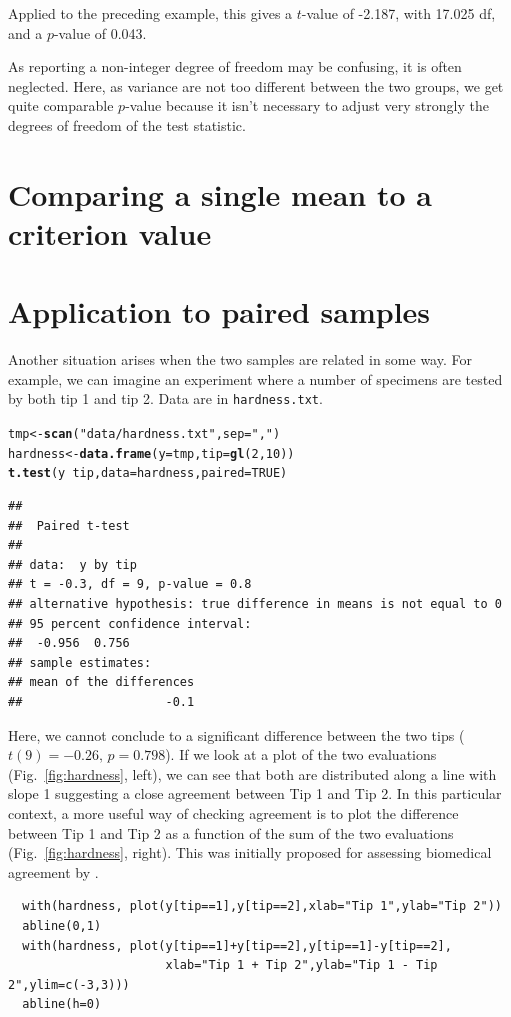 \documentclass[11pt,a4paper]{memoir}\usepackage[]{graphicx}\usepackage[]{color}
\makeatletter
\newcommand{\hlnum}[1]{\textcolor[rgb]{0.686,0.059,0.569}{#1}}%
\newcommand{\hlstr}[1]{\textcolor[rgb]{0.192,0.494,0.8}{#1}}%
\newcommand{\hlopt}[1]{\textcolor[rgb]{0,0,0}{#1}}%
\newcommand{\hlstd}[1]{\textcolor[rgb]{0.345,0.345,0.345}{#1}}%
\newcommand{\hlkwb}[1]{\textcolor[rgb]{0.69,0.353,0.396}{#1}}%
\newcommand{\hlkwc}[1]{\textcolor[rgb]{0.333,0.667,0.333}{#1}}%
\newcommand{\hlkwd}[1]{\textcolor[rgb]{0.737,0.353,0.396}{\textbf{#1}}}%
\newenvironment{kframe}{%
 \def\at@end@of@kframe{}%
 \ifinner\ifhmode%
  \def\at@end@of@kframe{\end{minipage}}%
  \begin{minipage}{\columnwidth}%
 \fi\fi%
 \def\FrameCommand##1{\hskip\@totalleftmargin \hskip-\fboxsep
 \colorbox{shadecolor}{##1}\hskip-\fboxsep
     \hskip-\linewidth \hskip-\@totalleftmargin \hskip\columnwidth}%
 \MakeFramed {\advance\hsize-\width
   \@totalleftmargin\z@ \linewidth\hsize
   \@setminipage}}%
 {\par\unskip\endMakeFramed%
 \at@end@of@kframe}
\newenvironment{knitrout}{}{} %
\makeatother
\begin{document}
Applied to the preceding example, this gives a $t$-value of -2.187,
with 17.025 df, and a $p$-value of 0.043.

As reporting a non-integer degree of freedom may be confusing, it is
often neglected. Here, as variance are not too different between the
two groups, we get quite comparable $p$-value because it isn't
necessary to adjust very strongly the degrees of freedom of the test
statistic.


\section{Comparing a single mean to a criterion value}

\section{Application to paired samples}
Another situation arises when the two samples are related in some
way. For example, we can imagine an experiment where a number of
specimens are tested by both tip 1 and tip 2. Data are in
\texttt{hardness.txt}.

\begin{knitrout}
\color{fgcolor}\begin{kframe}
\begin{alltt}
\hlstd{tmp} \hlkwb{<-} \hlkwd{scan}\hlstd{(}\hlstr{"data/hardness.txt"}\hlstd{,} \hlkwc{sep} \hlstd{=} \hlstr{","}\hlstd{)}
\hlstd{hardness} \hlkwb{<-} \hlkwd{data.frame}\hlstd{(}\hlkwc{y} \hlstd{= tmp,} \hlkwc{tip} \hlstd{=} \hlkwd{gl}\hlstd{(}\hlnum{2}\hlstd{,}\hlnum{10}\hlstd{))}
\hlkwd{t.test}\hlstd{(y} \hlopt{~} \hlstd{tip,} \hlkwc{data} \hlstd{= hardness,} \hlkwc{paired} \hlstd{=} \hlnum{TRUE}\hlstd{)}
\end{alltt}
\begin{verbatim}
## 
## 	Paired t-test
## 
## data:  y by tip
## t = -0.3, df = 9, p-value = 0.8
## alternative hypothesis: true difference in means is not equal to 0
## 95 percent confidence interval:
##  -0.956  0.756
## sample estimates:
## mean of the differences 
##                    -0.1
\end{verbatim}
\end{kframe}
\end{knitrout}

Here, we cannot conclude to a significant difference between the two
tips ($t(9)=-0.26,\, p=0.798$).  If we look at a plot of the two
evaluations (Fig.~\ref{fig:hardness}, left), we can see that both are
distributed along a line with slope 1 suggesting a close agreement
between Tip 1 and Tip 2. In this particular context, a more useful way
of checking agreement is to plot the difference between Tip 1 and Tip
2 as a function of the sum of the two evaluations
(Fig.~\ref{fig:hardness}, right). This was initially proposed for
assessing biomedical agreement by \cite{Bland:1986}.
\begin{verbatim}
  with(hardness, plot(y[tip==1],y[tip==2],xlab="Tip 1",ylab="Tip 2"))
  abline(0,1)
  with(hardness, plot(y[tip==1]+y[tip==2],y[tip==1]-y[tip==2],
                      xlab="Tip 1 + Tip 2",ylab="Tip 1 - Tip 2",ylim=c(-3,3)))
  abline(h=0)
\end{verbatim}
\end{document}

